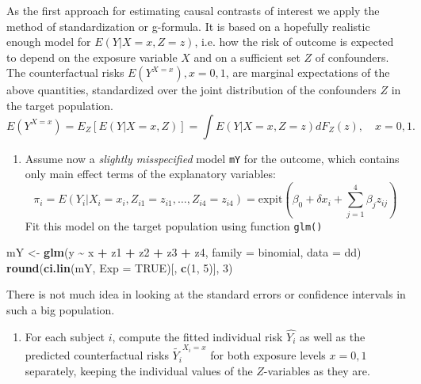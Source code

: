 \documentclass[
]{book}
\newenvironment{Shaded}{\begin{snugshade}}{\end{snugshade}}
\newcommand{\AttributeTok}[1]{\textcolor[rgb]{0.13,0.29,0.53}{#1}}
\newcommand{\ConstantTok}[1]{\textcolor[rgb]{0.56,0.35,0.01}{#1}}
\newcommand{\DecValTok}[1]{\textcolor[rgb]{0.00,0.00,0.81}{#1}}
\newcommand{\FunctionTok}[1]{\textcolor[rgb]{0.13,0.29,0.53}{\textbf{#1}}}
\newcommand{\NormalTok}[1]{#1}
\newcommand{\OtherTok}[1]{\textcolor[rgb]{0.56,0.35,0.01}{#1}}
\newcommand{\SpecialCharTok}[1]{\textcolor[rgb]{0.81,0.36,0.00}{\textbf{#1}}}
\providecommand{\tightlist}{%
  \setlength{\itemsep}{0pt}\setlength{\parskip}{0pt}}
\begin{document}
As the first approach for estimating causal contrasts of interest
we apply the method of standardization or g-formula. It is
based on a hopefully realistic enough model for
\(E(Y|X=x, Z=z)\), i.e.
how the risk of outcome is
expected to depend on the exposure variable \(X\) and
on a sufficient set \(Z\) of confounders. The counterfactual
risks \(E(Y^{X=x}), x=0,1\), are marginal expectations
of the above quantities, standardized over the joint
distribution of the confounders \(Z\) in the target population.
\[ E(Y^{X=x}) = E_Z[E(Y|X=x,Z)]
       = \int E(Y|X=x, Z=z)dF_Z(z), \quad x=0,1. \]

\begin{enumerate}
\def\labelenumi{\arabic{enumi}.}
\tightlist
\item
  Assume now a \emph{slightly misspecified} model \texttt{mY}
  for the outcome,
  which contains only main effect terms of the explanatory variables:
  \[ \pi_i = E(Y_i|X_i=x_i, Z_{i1}=z_{i1}, \dots, Z_{i4}=z_{i4}) =
    \text{expit}\left(\beta_0 + \delta x_i +
    \sum_{j=1}^4 \beta_j z_{ij} \right) \]
  Fit this model on the target population using function \texttt{glm()}
\end{enumerate}

\begin{Shaded}
\begin{Highlighting}[]
\NormalTok{mY }\OtherTok{\textless{}{-}} \FunctionTok{glm}\NormalTok{(y }\SpecialCharTok{\textasciitilde{}}\NormalTok{ x }\SpecialCharTok{+}\NormalTok{ z1 }\SpecialCharTok{+}\NormalTok{ z2 }\SpecialCharTok{+}\NormalTok{ z3 }\SpecialCharTok{+}\NormalTok{ z4, }\AttributeTok{family =}\NormalTok{ binomial, }\AttributeTok{data =}\NormalTok{ dd)}
\FunctionTok{round}\NormalTok{(}\FunctionTok{ci.lin}\NormalTok{(mY, }\AttributeTok{Exp =} \ConstantTok{TRUE}\NormalTok{)[, }\FunctionTok{c}\NormalTok{(}\DecValTok{1}\NormalTok{, }\DecValTok{5}\NormalTok{)], }\DecValTok{3}\NormalTok{)}
\end{Highlighting}
\end{Shaded}

There is not much idea in looking at the
standard errors or confidence intervals in such a big population.

\begin{enumerate}
\def\labelenumi{\arabic{enumi}.}
\setcounter{enumi}{1}
\tightlist
\item
  For each subject \(i\), compute the fitted
  individual risk \(\widehat{Y_i}\) as well as
  the predicted counterfactual
  risks \(\widetilde{Y_i}^{X_i=x}\) for both exposure levels
  \(x=0,1\) separately,
  keeping the individual values of the \(Z\)-variables as they are.
\end{enumerate}
\end{document}
